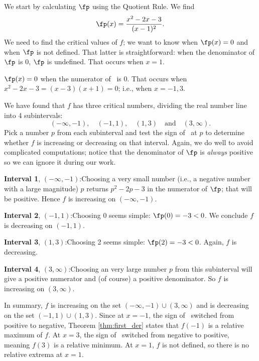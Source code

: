 {We start by calculating $\fp$ using the Quotient Rule. We find
$$\fp(x) = \frac{x^2-2x-3}{(x-1)^2}.$$
We need to find the critical values of $f$; we want to know when $\fp(x)=0$ and when $\fp$ is not defined. That latter is straightforward: when the denominator of $\fp$ is 0, $\fp$ is undefined. That occurs when $x=1$.


$\fp(x)=0$ when the numerator of \fp\ is 0. That occurs when $x^2-2x-3 = (x-3)(x+1) = 0$; i.e., when $x=-1,3$. 

We have found that $f$ has three critical numbers, dividing the real number line into 4 subintervals: $$(-\infty,-1), \quad (-1, 1), \quad (1,3) \quad \text{and} \quad (3,\infty).$$ Pick a number $p$ from each subinterval and test the sign of \fp\ at $p$ to determine whether $f$ is increasing or decreasing on that interval. Again, we do well to avoid complicated computations; notice that the denominator of $\fp$ is \textit{always} positive so we can ignore it during our work.

\noindent\textbf{Interval 1}, $(-\infty,-1)$:\quad  Choosing a very small number (i.e., a negative number with a large magnitude) $p$ returns $p^2-2p-3$ in the numerator of $\fp$; that will be positive. Hence $f$ is increasing on $(-\infty,-1)$.

\noindent\textbf{Interval 2}, $(-1,1)$:\quad Choosing 0 seems simple: $\fp(0)=-3<0$. We conclude $f$ is decreasing on $(-1,1)$.

\noindent\textbf{Interval 3}, $(1,3)$:\quad Choosing 2 seems simple: $\fp(2) = -3<0$. Again, $f$ is decreasing.

\noindent \textbf{Interval 4}, $(3,\infty)$:\quad	Choosing an very large number $p$ from this subinterval will give a positive numerator and (of course) a positive denominator. So $f$ is increasing on $(3,\infty)$.

In summary, $f$ is increasing on the set $(-\infty,-1)\cup (3,\infty)$ and is decreasing on the set $(-1,1)\cup (1,3)$. Since at $x=-1$, the sign of \fp\ switched from positive to negative, Theorem \ref{thm:first_der} states that $f(-1)$ is a relative maximum of $f$. At $x=3$, the sign of \fp\ switched from negative to positive, meaning $f(3)$ is a relative minimum. At $x=1$, $f$ is not defined, so there is no relative extrema at $x=1$.
 
}
